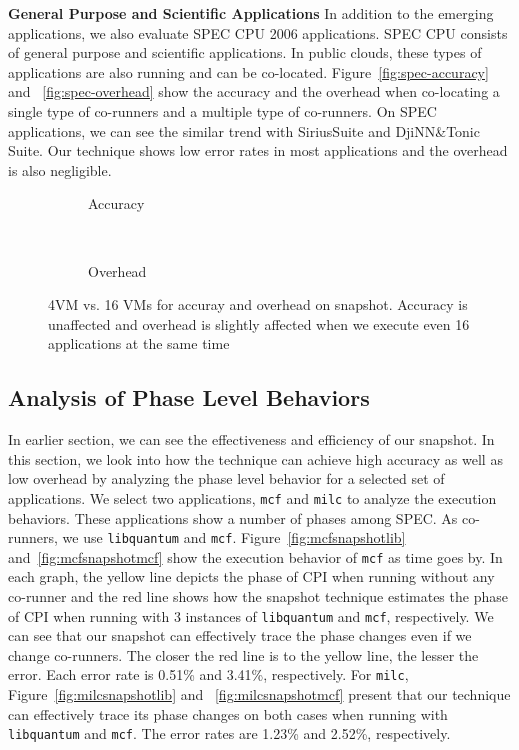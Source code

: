 \documentclass{sig-alternate}
\begin{document}
\textbf{General Purpose and Scientific Applications}
In addition to the emerging applications, we also evaluate SPEC CPU 2006 applications. SPEC CPU consists of general purpose and scientific applications. In public clouds, these types of applications are also running and can be co-located. 
Figure~\ref{fig:spec-accuracy} and ~\ref{fig:spec-overhead} show the accuracy and the overhead when co-locating a single type of co-runners and a multiple type of co-runners. On SPEC applications, we can see the similar trend with SiriusSuite and DjiNN\&Tonic Suite. Our technique shows low error rates in most applications and the overhead is also negligible.
\begin{figure*}
\centering
\begin{subfigure}[t]{2\columnwidth}
\centering
{}
\caption{Accuracy}
\label{fig:accuracy-4-16VMs}
\end{subfigure}
\hfill\\
\begin{subfigure}[t]{2\columnwidth}
\centering
{}
\caption{Overhead}
\label{fig:overhead-4-16VMs}
\end{subfigure}
\caption{4VM vs. 16 VMs for accuray and overhead on snapshot. Accuracy is unaffected and overhead is slightly affected when we execute even 16 applications at the same time}
\label{fig:scalability}
\end{figure*}
\subsection{Analysis of Phase Level Behaviors}
\label{subsec:AnalysisofPhaseLevelBehaviors}

In earlier section, we can see the effectiveness and efficiency of our snapshot. In this section, we look into how the technique can achieve high accuracy as well as low overhead by analyzing the phase level behavior for a selected set of applications. We select two applications, \texttt{mcf} and \texttt{milc} to analyze the execution behaviors. These applications show a number of phases among SPEC. As co-runners, we use \texttt{libquantum} and \texttt{mcf}. Figure~\ref{fig:mcfsnapshotlib} and~\ref{fig:mcfsnapshotmcf} show the execution behavior of \texttt{mcf} as time goes by. In each graph, the yellow line depicts the phase of CPI when running without any co-runner and the red line shows how the snapshot technique estimates the phase of CPI when running with 3 instances of \texttt{libquantum} and \texttt{mcf}, respectively. We can see that our snapshot can effectively trace the phase changes even if we change co-runners. The closer the red line is to the yellow line, the lesser the error. Each error rate is 0.51\% and 3.41\%, respectively. For \texttt{milc}, Figure~\ref{fig:milcsnapshotlib} and ~\ref{fig:milcsnapshotmcf} present that our technique can effectively trace its phase changes on both cases when running with \texttt{libquantum} and \texttt{mcf}. The error rates are 1.23\% and 2.52\%, respectively.
\end{document}

